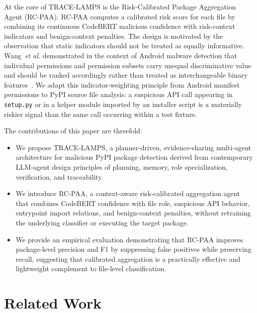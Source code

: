 \documentclass[conference,a4paper]{IEEEtran}
\newcommand{\rcpaa}{RC-PAA}
\newcommand{\tracelamps}{TRACE-LAMPS}
\newcommand{\codebert}{CodeBERT}
\begin{document}
At the core of \tracelamps{} is the Risk-Calibrated Package Aggregation Agent
(\rcpaa{}). \rcpaa{} computes a calibrated risk score for each file by combining
its continuous \codebert{} malicious confidence with risk-context indicators and
benign-context penalties. The design is motivated by the observation that static
indicators should not be treated as equally informative. Wang~\emph{et al.} demonstrated
in the context of Android malware detection that individual permissions and permission
subsets carry unequal discriminative value and should be ranked accordingly rather than
treated as interchangeable binary features~\cite{wang2014permission}. We adapt this
indicator-weighting principle from Android manifest permissions to PyPI source file
analysis: a suspicious API call appearing in \texttt{setup.py} or in a helper module
imported by an installer script is a materially riskier signal than the same call
occurring within a test fixture.

The contributions of this paper are threefold:
\begin{itemize}
    \item We propose \tracelamps{}, a planner-driven, evidence-sharing multi-agent
    architecture for malicious PyPI package detection derived from contemporary
    LLM-agent design principles of planning, memory, role specialization,
    verification, and traceability.
    \item We introduce \rcpaa{}, a context-aware risk-calibrated aggregation agent
    that combines \codebert{} confidence with file role, suspicious API behavior,
    entrypoint import relations, and benign-context penalties, without retraining
    the underlying classifier or executing the target package.
    \item We provide an empirical evaluation demonstrating that \rcpaa{} improves
    package-level precision and F1 by suppressing false positives while preserving
    recall, suggesting that calibrated aggregation is a practically effective and
    lightweight complement to file-level classification.
\end{itemize}


\section{Related Work}
\end{document}
